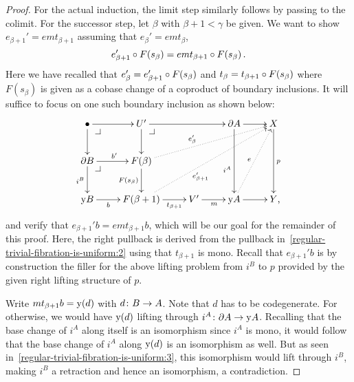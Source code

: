 \documentclass[reqno,10pt,a4paper,oneside,draft]{amsart}
\begin{document}
{{\begin{proof}
For the actual induction, the limit step similarly follows by passing to the colimit.
For the successor step, let $\beta$ with $\beta + 1 < \gamma$ be given.
We want to show $e_{\beta+1}' = e m t_{\beta+1}$ assuming that $e_{\beta}' = e m t_{\beta}$, \ie
\begin{equation} \label{regular-trivial-fibration-is-uniform:ih}
  e_{\beta+1}' \mathbin{\circ} F(s_{\beta}) = e m t_{\beta+1} \mathbin{\circ} F(s_{\beta}) \, .
\end{equation}
Here we have recalled that $e_{\beta}' = e_{\beta+1}' \mathbin{\circ} F(s_{\beta})$ and $t_{\beta} = t_{\beta+1} \mathbin{\circ} F(s_{\beta})$ where $F(s_{\beta})$ is given as a cobase change of a coproduct of boundary inclusions.
It will suffice to focus on one such boundary inclusion as shown below:
\begin{equation} \label{regular-trivial-fibration-is-uniform:3}
\begin{gathered}
\xymatrix{
  \bullet
  \ar[r]
  \ar[d]
  \pullback{dr}
&
  U'
  \ar[rr]
  \ar[d]
  \pullback{dr}
&&
  \partial A
  \ar[r]
  \ar[dd]_(0.6){i^A}
&
  X
  \ar[dd]^{p}
\\
  \partial B
  \ar[r]^{b'}
  \ar[d]_{i^B}
  \pullback{dr}
&
  F(\beta)
  \ar[d]_{F(s_{\beta})}
  \ar@{.>}[urrr]^(0.4){e_{\beta}'}
\\
  \yon B
  \ar[r]_-{b}
&
  F(\beta+1)
  \ar[r]_-{t_{\beta+1}}
  \ar@{.>}[uurrr]_(0.4){e_{\beta+1}'}
&
  V'
  \ar[r]_{m}
&
  \yon A
  \ar[r]
  \ar@{.>}[uur]^{e}
&
  Y
\rlap{,}}
\end{gathered}
\end{equation}
and verify that $e_{\beta+1}' b = e m t_{\beta+1} b$, which will be our goal for the remainder of this proof.
Here, the right pullback is derived from the pullback in~\eqref{regular-trivial-fibration-is-uniform:2} using that $t_{\beta+1}$ is mono.
Recall that $e_{\beta+1}' b$ is by construction the filler for the above lifting problem from $i^B$ to $p$ provided by the given right lifting structure of $p$.

Write $m t_{\beta+1} b = \mathrm{y}(d)$ with $d \colon B \to A$.
Note that $d$ has to be codegenerate.
For otherwise, we would have $\mathrm{y}(d)$ lifting through $i^A \colon \partial A \to \mathrm{y} A$.
Recalling that the base change of $i^A$ along itself is an isomorphism since $i^A$ is mono, it would follow that the base change of $i^A$ along $\mathrm{y}(d)$ is an isomorphism as well.
But as seen in~\eqref{regular-trivial-fibration-is-uniform:3}, this isomorphism would lift through $i^B$, making $i^B$ a retraction and hence an isomorphism, a contradiction.


\end{proof}}}
\end{document}
